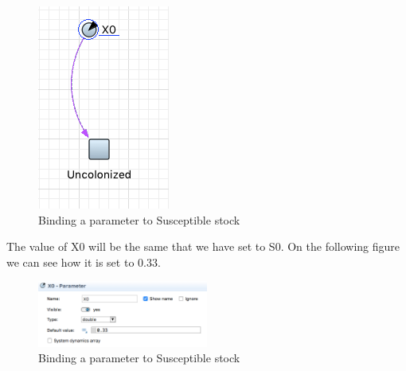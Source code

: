 \begin{figure}[!ht]
  \centering
  \includegraphics[height=0.5\textwidth]{img/screens/basic/basic9}
  \caption{Binding a parameter to Susceptible stock}
\end{figure}

The value of X0 will be the same that we have set to S0. On the following figure we can see how it is set to 0.33.

\begin{figure}[!ht]
  \centering
  \includegraphics[width=0.5\textwidth]{img/screens/basic/basic6}
  \caption{Binding a parameter to Susceptible stock}
\end{figure}




